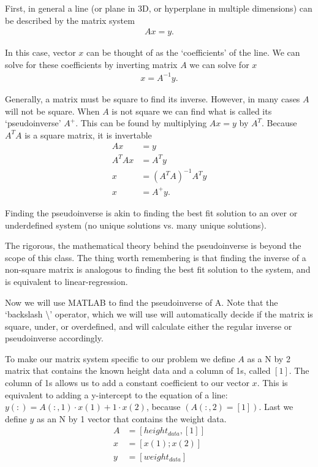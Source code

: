 \documentclass[12pt]{article}
\begin{document}
First, in general a line (or plane in 3D, or hyperplane in multiple dimensions) can be described by the matrix system
\begin{align*}
Ax=y.
\end{align*}

In this case, vector $x$ can be thought of as the `coefficients' of the line. We can solve for these coefficients by inverting matrix $A$ we can solve for $x$ 
\begin{align*}
x=A^{-1}y.
\end{align*}

Generally, a matrix must be square to find its inverse. However, in many cases $A$ will not be square. When $A$ is not square we can find what is called its `pseudoinverse' $A^{+}$. This can be found by multiplying $Ax=y$ by $A^{T}$. Because $A^{T}A$ is a square matrix, it is invertable 
\begin{align*}
Ax&=y\\
A^{T}Ax&=A^{T}y\\
x&=(A^{T}A)^{-1}A^{T}y\\
x&=A^{+}y.
\end{align*}

Finding the pseudoinverse is akin to finding the best fit solution to an over or underdefined system (no unique solutions vs. many unique solutions).

The rigorous, the mathematical theory behind the pseudoinverse is beyond the scope of this class. The thing worth remembering is that finding the inverse of a non-square matrix is analogous to finding the best fit solution to the system, and is equivalent to linear-regression.  

Now we will use MATLAB to find the pseudoinverse of A. Note that the `backslash \textbackslash' operator, which we will use will automatically decide if the matrix is square, under, or overdefined, and will calculate either the regular inverse or pseudoinverse accordingly. 

To make our matrix system specific to our problem we define $A$ as a N by 2 matrix that contains the known height data and a column of 1s, called $[1]$. The column of 1s allows us to add a constant coefficient to our vector $x$. This is equivalent to adding a y-intercept to the equation of a line: $y(:)=A(:,1)\cdot x(1)+1 \cdot x(2)$, because $(A(:,2)=[1])$. Last we define $y$ as an N by 1 vector that contains the weight data.
\begin{align*}
A&=[height_{data}, [1]]\\
x&=[x(1); x(2)]\\
y&=[weight_{data}]
\end{align*}
\end{document}
